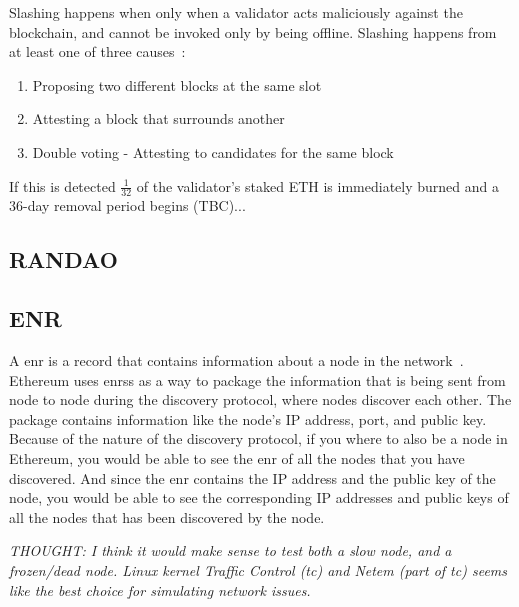 Slashing happens when only when a validator acts maliciously against the blockchain, and cannot be invoked only by being offline.
Slashing happens from at least one of three causes~\cite{PoSRewAndPen}:
\begin{enumerate}
    \item Proposing two different blocks at the same slot
    \item Attesting a block that surrounds another
    \item Double voting - Attesting to candidates for the same block
\end{enumerate}
If this is detected $\frac{1}{32}$ of the validator's staked ETH is immediately burned and a 36-day removal period begins (TBC)...
\subsection{RANDAO}\label{subsec:randao}

\subsection{ENR}\label{subsec:enr}
A \gls{enr} is a record that contains information about a node in the network~\cite{EIP-778:Ethereum-Node-Records}.
Ethereum uses \glspl{enr}s as a way
to package the information that is being sent from node to node during the discovery protocol,
where nodes discover each other.
The package contains information like the node's IP address, port, and public key.
Because of the nature of the discovery protocol, if you where to also be a node in Ethereum,
you would be able to see the \gls{enr} of all the nodes that you have discovered.
And since the \gls{enr} contains the IP address and the public key of the node,
you would be able
to see the corresponding IP addresses and public keys of all the nodes that has been discovered by the node.



\textit{THOUGHT: I think it would make sense to test both a slow node, and a frozen/dead node.
Linux kernel Traffic Control (tc) and Netem (part of tc) seems like the best choice for simulating network issues.}
